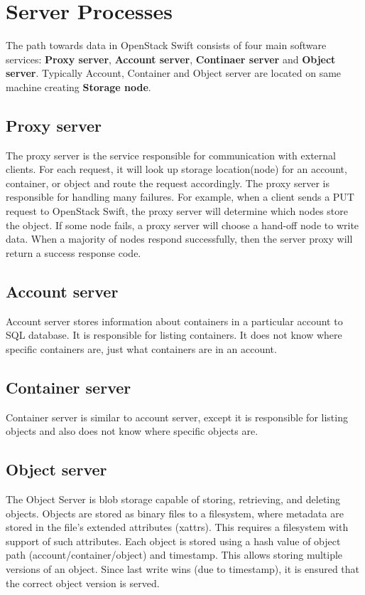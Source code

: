     \section{Server Processes}
    The path towards data in OpenStack Swift consists of four main software services: \textbf{Proxy server}, \textbf{Account server}, \textbf{Continaer server} and \textbf{Object server}. Typically Account, Container and Object server are located on same machine creating \textbf{Storage node}.

    \subsection{Proxy server}
    The proxy server is the service responsible for communication with external clients. For each request, it will look up storage location(node) for an account, container, or object and route the request accordingly\cite{SwiftArchitecturalOverview}. The proxy server is responsible for handling many failures. For example, when a client sends a PUT request to OpenStack Swift, the proxy server will determine which nodes store the object. If some node fails, a proxy server will choose a hand-off node to write data. When a majority of nodes respond successfully, then the server proxy will return a success response code\cite{swiftOpenStackSwift}.

    \subsection{Account server}
    Account server stores information about containers in a particular account to SQL database. It is responsible for listing containers. It does not know where specific containers are, just what containers are in an account\cite{SwiftArchitecturalOverview}.

    \subsection{Container server}
    Container server is similar to account server, except it is responsible for listing objects and also does not know where specific objects are\cite{SwiftArchitecturalOverview}.

    \subsection{Object server}
    The Object Server is blob storage capable of storing, retrieving, and deleting objects. Objects are stored as binary files to a filesystem, where metadata are stored in the file's extended attributes (xattrs). This requires a filesystem with support of such attributes. Each object is stored using a hash value of object path (account/container/object) and timestamp. This allows storing multiple versions of an object. Since last write wins (due to timestamp), it is ensured that the correct object version is served\cite{SwiftArchitecturalOverview}.

